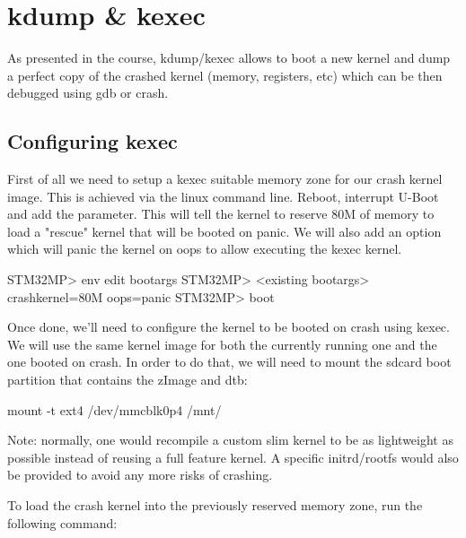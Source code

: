 \section{kdump \& kexec}

As presented in the course, kdump/kexec allows to boot a new kernel and dump a
perfect copy of the crashed kernel (memory, registers, etc) which can be then
debugged using gdb or crash. 

\subsection{Configuring kexec}
First of all we need to setup a kexec suitable memory zone for our crash kernel
image. This is achieved via the linux command line. Reboot, interrupt U-Boot and
add the  parameter. This will tell the kernel to reserve
80M of memory to load a "rescue" kernel that will be booted on panic. We will
also add an option which will panic the kernel on oops to allow executing the
kexec kernel.

\begin{bashinput}
STM32MP> env edit bootargs
STM32MP> <existing bootargs> crashkernel=80M oops=panic
STM32MP> boot
\end{bashinput}

Once done, we'll need to configure the kernel to be booted on crash using kexec.
We will use the same kernel image for both the currently running one and the one
booted on crash. In order to do that, we will need to mount the sdcard boot
partition that contains the zImage and dtb:

\begin{bashinput}
mount -t ext4 /dev/mmcblk0p4 /mnt/
\end{bashinput}

Note: normally, one would recompile a custom slim kernel to be as lightweight
as possible instead of reusing a full feature kernel. A specific initrd/rootfs
would also be provided to avoid any more risks of crashing.

To load the crash kernel into the previously reserved memory zone, run the
following command:


